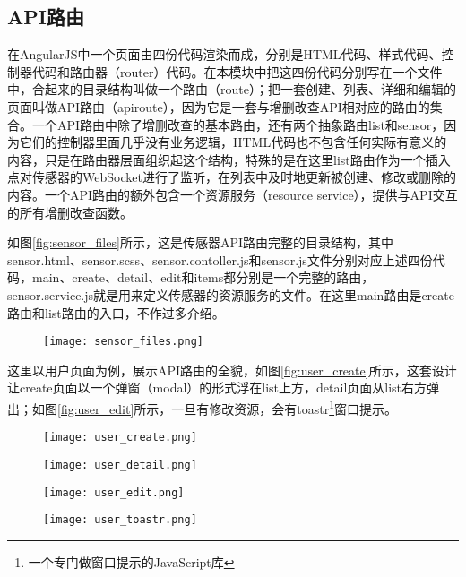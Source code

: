 \subsection{API路由}
在AngularJS中一个页面由四份代码渲染而成，分别是HTML代码、样式代码、控制器代码和路由器（router）代码。在本模块中把这四份代码分别写在一个文件中，合起来的目录结构叫做一个路由（route）；把一套创建、列表、详细和编辑的页面叫做API路由（apiroute），因为它是一套与增删改查API相对应的路由的集合。一个API路由中除了增删改查的基本路由，还有两个抽象路由list和sensor，因为它们的控制器里面几乎没有业务逻辑，HTML代码也不包含任何实际有意义的内容，只是在路由器层面组织起这个结构，特殊的是在这里list路由作为一个插入点对传感器的WebSocket进行了监听，在列表中及时地更新被创建、修改或删除的内容。一个API路由的额外包含一个资源服务（resource service），提供与API交互的所有增删改查函数。

如图\ref{fig:sensor_files}所示，这是传感器API路由完整的目录结构，其中sensor.html、sensor.scss、sensor.contoller.js和sensor.js文件分别对应上述四份代码，main、create、detail、edit和items都分别是一个完整的路由，sensor.service.js就是用来定义传感器的资源服务的文件。在这里main路由是create路由和list路由的入口，不作过多介绍。
\begin{figure}[H]
 \centering
 \texttt{[image: sensor\_files.png]}
\end{figure}

这里以用户页面为例，展示API路由的全貌，如图\ref{fig:user_create}所示，这套设计让create页面以一个弹窗（modal）的形式浮在list上方，detail页面从list右方弹出；如图\ref{fig:user_edit}所示，一旦有修改资源，会有toastr\footnote{一个专门做窗口提示的JavaScript库}窗口提示。
\begin{figure}[H]
 \centering
 \texttt{[image: user\_create.png]}

 \vspace{0.5cm}

 \texttt{[image: user\_detail.png]}
\end{figure}
\begin{figure}[H]
 \centering
 \texttt{[image: user\_edit.png]}

 \vspace{0.5cm}

 \texttt{[image: user\_toastr.png]}
\end{figure}

